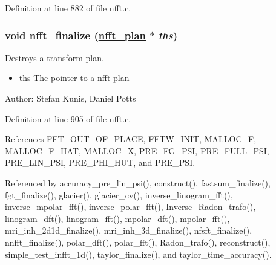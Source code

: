 Definition at line 882 of file nfft.c.\hypertarget{group__nfft_ga15}{
\subsubsection[nfft\_\-finalize]{\setlength{\rightskip}{0pt plus 5cm}void nfft\_\-finalize (\hyperlink{structnfft__plan}{nfft\_\-plan} $\ast$ {\em ths})}}
\label{group__nfft_ga15}


Destroys a transform plan. 

\begin{itemize}
\item ths The pointer to a nfft plan\end{itemize}
\begin{Desc}
\item[Author:]Stefan Kunis, Daniel Potts \end{Desc}


Definition at line 905 of file nfft.c.

References FFT\_\-OUT\_\-OF\_\-PLACE, FFTW\_\-INIT, MALLOC\_\-F, MALLOC\_\-F\_\-HAT, MALLOC\_\-X, PRE\_\-FG\_\-PSI, PRE\_\-FULL\_\-PSI, PRE\_\-LIN\_\-PSI, PRE\_\-PHI\_\-HUT, and PRE\_\-PSI.

Referenced by accuracy\_\-pre\_\-lin\_\-psi(), construct(), fastsum\_\-finalize(), fgt\_\-finalize(), glacier(), glacier\_\-cv(), inverse\_\-linogram\_\-fft(), inverse\_\-mpolar\_\-fft(), inverse\_\-polar\_\-fft(), Inverse\_\-Radon\_\-trafo(), linogram\_\-dft(), linogram\_\-fft(), mpolar\_\-dft(), mpolar\_\-fft(), mri\_\-inh\_\-2d1d\_\-finalize(), mri\_\-inh\_\-3d\_\-finalize(), nfsft\_\-finalize(), nnfft\_\-finalize(), polar\_\-dft(), polar\_\-fft(), Radon\_\-trafo(), reconstruct(), simple\_\-test\_\-infft\_\-1d(), taylor\_\-finalize(), and taylor\_\-time\_\-accuracy().